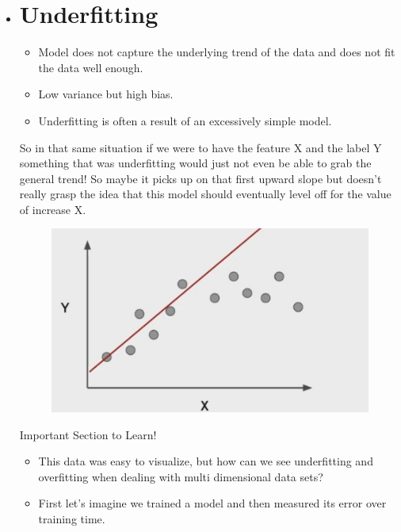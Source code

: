 \documentclass[12pt]{article}
\begin{document}
\begin{itemize}
	\item 
	\section{Underfitting}
	
	\begin{itemize}
		\item
		Model does not capture the underlying trend of the data and does not fit the data well enough.
		\item
	Low variance but high bias.		
		\item
	Underfitting is often a result of an excessively simple model.
	\end{itemize}

	So in that same situation if we were to have the feature X and the label Y something that was underfitting 
	would just not even be able to grab the general trend! So maybe it picks up on that first upward slope but doesn't really grasp the idea that this model should eventually level off for the value of increase X.
	
\begin{figure}[htbp]
\centerline{\includegraphics[scale=.5]{img/underfittingUpwardSlope.jpg}}
\end{figure}
	
	\LARGE Important Section to Learn!
	
	\small
	\begin{itemize}
		\item
		This data was easy to visualize, but how can we see underfitting and overfitting when dealing with multi dimensional data sets?
		
		\item
		First let's imagine we trained a model and then measured its error over training time.
	\end{itemize}
	

\end{itemize}
\end{document}
